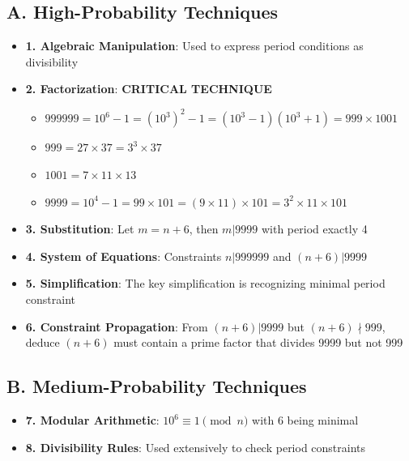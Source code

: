 \documentclass[11pt]{article}
\begin{document}
\begin{conversionbox}
\subsection*{A. High-Probability Techniques}
\begin{itemize}[leftmargin=*]
    \item \textbf{1. Algebraic Manipulation}: Used to express period conditions as divisibility
    
    \item \textbf{2. Factorization}: \textbf{CRITICAL TECHNIQUE}
    \begin{itemize}
        \item $999999 = 10^6 - 1 = (10^3)^2 - 1 = (10^3-1)(10^3+1) = 999 \times 1001$
        \item $999 = 27 \times 37 = 3^3 \times 37$
        \item $1001 = 7 \times 11 \times 13$
        \item $9999 = 10^4 - 1 = 99 \times 101 = (9 \times 11) \times 101 = 3^2 \times 11 \times 101$
    \end{itemize}
    
    \item \textbf{3. Substitution}: Let $m = n + 6$, then $m | 9999$ with period exactly 4
    
    \item \textbf{4. System of Equations}: Constraints $n | 999999$ and $(n+6) | 9999$
    
    \item \textbf{5. Simplification}: The key simplification is recognizing minimal period constraint
    
    \item \textbf{6. Constraint Propagation}: From $(n+6) | 9999$ but $(n+6) \nmid 999$, deduce $(n+6)$ must contain a prime factor that divides 9999 but not 999
\end{itemize}

\subsection*{B. Medium-Probability Techniques}
\begin{itemize}[leftmargin=*]
    \item \textbf{7. Modular Arithmetic}: $10^6 \equiv 1 \pmod{n}$ with 6 being minimal
    
    \item \textbf{8. Divisibility Rules}: Used extensively to check period constraints
    

\end{itemize}
\end{conversionbox}
\end{document}
